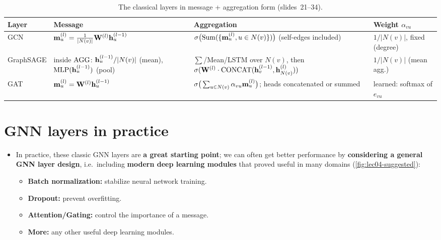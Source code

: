 \begin{table}[htbp]
  \centering\small
  \caption{The classical layers in message + aggregation form (slides~21--34).}
  \label{tab:lec04-layers}
  \renewcommand{\arraystretch}{1.25}
  \begin{tabularx}{\textwidth}{@{}l>{\raggedright\arraybackslash}p{3.9cm}>{\raggedright\arraybackslash}X>{\raggedright\arraybackslash}p{2.9cm}@{}}
    \toprule
    Layer & Message & Aggregation & Weight $\alpha_{vu}$\\
    \midrule
    GCN & $\mathbf{m}_u^{(l)}=\frac{1}{|N(v)|}\mathbf{W}^{(l)}\mathbf{h}_u^{(l-1)}$
        & $\sigma\big(\mathrm{Sum}(\{\mathbf{m}_u^{(l)}, u\in N(v)\})\big)$ (self-edges
          included)
        & $1/|N(v)|$, fixed (degree)\\
    GraphSAGE & inside $\operatorname{AGG}$: $\mathbf{h}_u^{(l-1)}/|N(v)|$ (mean),
          $\mathrm{MLP}(\mathbf{h}_u^{(l-1)})$ (pool)
        & $\sum$/Mean/LSTM over $N(v)$, then
          $\sigma(\mathbf{W}^{(l)}\cdot\operatorname{CONCAT}(\mathbf{h}_v^{(l-1)}, \mathbf{h}_{N(v)}^{(l)}))$
        & $1/|N(v)|$ (mean agg.)\\
    GAT & $\mathbf{m}_u^{(l)}=\mathbf{W}^{(l)}\mathbf{h}_u^{(l-1)}$
        & $\sigma\big(\sum_{u\in N(v)}\alpha_{vu}\mathbf{m}_u^{(l)}\big)$; heads
          concatenated or summed
        & learned: softmax of $e_{vu}$\\
    \bottomrule
  \end{tabularx}
\end{table}

\section{GNN layers in practice}\label{sec:lec04-practice}

\begin{itemize}
  \item In practice, these classic GNN layers are \textbf{a great starting
    point}; we can often get better performance by \textbf{considering a
    general GNN layer design}, i.e.\ including \textbf{modern deep learning
    modules} that proved useful in many domains (\cref{fig:lec04-suggested}):
    \begin{itemize}
      \item \textbf{Batch normalization:} stabilize neural network training.
      \item \textbf{Dropout:} prevent overfitting.
      \item \textbf{Attention/Gating:} control the importance of a message.
      \item \textbf{More:} any other useful deep learning modules.
    \end{itemize}
\end{itemize}


